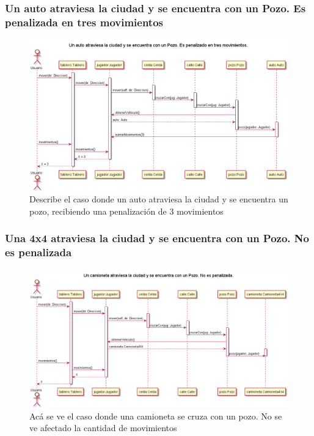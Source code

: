 \documentclass[titlepage,a4paper]{article}
\begin{document}
\subsubsection[]{Un auto atraviesa la ciudad y se encuentra con un Pozo. Es penalizada en tres movimientos}

\begin{figure}[H]
  \centering
  \includegraphics[width=1\textwidth]{diagramas/SecuenciaAutoCruzaUnPozoYEsPenalizado.png}
  \caption{\label{fig:class01} Describe el caso donde un auto atraviesa la ciudad y se encuentra un pozo, recibiendo una penalización de 3 movimientos}
\end{figure}


\subsubsection[]{Una 4x4 atraviesa la ciudad y se encuentra con un Pozo. No es penalizada}

\begin{figure}[H]
  \centering
  \includegraphics[width=1\textwidth]{diagramas/SecuenciaUnaCamionetaCruzaUnPozoYNoEsPenalizado.png}
  \caption{\label{fig:class01} Acá se ve el caso donde una camioneta se cruza con un pozo. No se ve afectado la cantidad de movimientos}
\end{figure}
\end{document}
